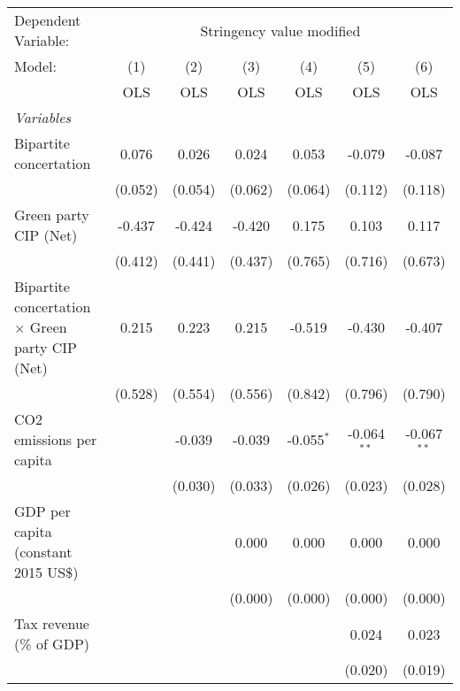 
\begingroup
\centering
\begin{tabular}{lcccccc}
   \toprule
   Dependent Variable: & \multicolumn{6}{c}{Stringency value modified}\\
   Model:                                                 & (1)     & (2)     & (3)     & (4)          & (5)           & (6)\\  
                                                          &  OLS    & OLS     & OLS     & OLS          & OLS           & OLS\\  
   \midrule
   \emph{Variables}\\
   Bipartite concertation                                 & 0.076   & 0.026   & 0.024   & 0.053        & -0.079        & -0.087\\   
                                                          & (0.052) & (0.054) & (0.062) & (0.064)      & (0.112)       & (0.118)\\   
   Green party CIP (Net)                                  & -0.437  & -0.424  & -0.420  & 0.175        & 0.103         & 0.117\\   
                                                          & (0.412) & (0.441) & (0.437) & (0.765)      & (0.716)       & (0.673)\\   
   Bipartite concertation $\times$ Green party CIP (Net)  & 0.215   & 0.223   & 0.215   & -0.519       & -0.430        & -0.407\\   
                                                          & (0.528) & (0.554) & (0.556) & (0.842)      & (0.796)       & (0.790)\\   
   CO2 emissions per capita                               &         & -0.039  & -0.039  & -0.055$^{*}$ & -0.064$^{**}$ & -0.067$^{**}$\\   
                                                          &         & (0.030) & (0.033) & (0.026)      & (0.023)       & (0.028)\\   
   GDP per capita (constant 2015 US\$)                    &         &         & 0.000   & 0.000        & 0.000         & 0.000\\   
                                                          &         &         & (0.000) & (0.000)      & (0.000)       & (0.000)\\   
   Tax revenue (\% of GDP)                                &         &         &         &              & 0.024         & 0.023\\   
                                                          &         &         &         &              & (0.020)       & (0.019)\\   

\end{tabular}

